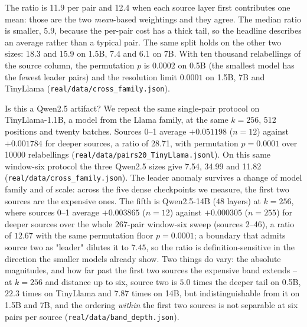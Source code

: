 \documentclass[10pt]{article}
\begin{document}
The ratio is 11.9 per pair and 12.4 when each source layer first
contributes one mean: those are the two \emph{mean}-based weightings and they
agree. The median ratio is smaller, 5.9, because the per-pair cost has a thick
tail, so the headline describes an average rather than a typical pair. The same
split holds on the other two sizes: 18.3 and 15.9 on
1.5B, 7.4 and 6.1 on 7B. With ten thousand relabellings of the source column,
the permutation $p$ is $0.0002$ on 0.5B (the smallest model has the fewest
leader pairs) and the resolution limit $0.0001$ on 1.5B, 7B and TinyLlama
(\texttt{real/data/cross\_family.json}).

Is this a Qwen2.5 artifact? We repeat the same single-pair protocol on
TinyLlama-1.1B, a model from the Llama family, at the same $k=256$,
512 positions and twenty batches. Sources 0--1 average $+0.051198$
($n=12$) against $+0.001784$ for deeper sources, a ratio of 28.71,
with permutation $p=0.0001$ over 10000 relabellings
(\texttt{real/data/pairs20\_TinyLlama.jsonl}). On this same
window-six protocol the three Qwen2.5 sizes give 7.54, 34.99 and 11.82
(\texttt{real/data/cross\_family.json}). The leader anomaly survives a
change of model family and of scale: across the five dense checkpoints we
measure, the first two sources are the expensive ones. The fifth is
Qwen2.5-14B ($48$ layers) at $k{=}256$, where sources 0--1 average
$+0.003865$ ($n=12$) against $+0.000305$ ($n=255$) for deeper sources over the
whole $267$-pair window-six sweep (sources 2--46), a ratio of
$12.67$ with the same permutation floor $p=0.0001$; a boundary that admits
source two as "leader" dilutes it to $7.45$, so the ratio is definition-sensitive
in the direction the smaller models already show. Two things do vary: the absolute
magnitudes, and how far past the first two sources the expensive band
extends -- at $k{=}256$ and distance up to six, source two is $5.0$ times the
deeper tail on 0.5B, $22.3$ times on TinyLlama and $7.87$ times on 14B, but
indistinguishable from it on 1.5B and 7B, and the ordering \emph{within} the
first two sources is not separable at six pairs per source
(\texttt{real/data/band\_depth.json}).
\end{document}

